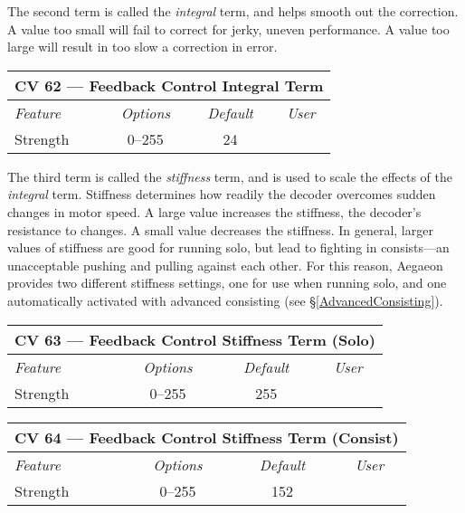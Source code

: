 \documentclass[12pt,letterpaper,draft]{memoir} %
\begin{document}
The second term is called the \textit{integral} term, and helps smooth out the correction. A value too small will fail to correct for jerky, uneven performance. A value too large will result in too slow a correction in error.

\label{CV62}
\begin{center}
\begin{tabular}{|l|c|c|c|}
\hline
\multicolumn{4}{|c|}{\textbf{CV 62 --- Feedback Control Integral Term}} \\ \hline \hline
\textit{Feature} & \textit{Options} & \textit{Default} & \textit{User} \\ \hline
Strength & 0--255 & 24 &\\ \hline
\end{tabular}
\end{center}

\label{MotorControlInConsist}The third term is called the \textit{stiffness} term, and is used to scale the effects of the \textit{integral} term. Stiffness determines how readily the decoder overcomes sudden changes in motor speed. A large value increases the stiffness, the decoder's resistance to changes. A small value decreases the stiffness. In general, larger values of stiffness are good for running solo, but lead to fighting in consists---an unacceptable pushing and pulling against each other. For this reason, Aegaeon provides two different stiffness settings, one for use when running solo, and one automatically activated with advanced consisting (see \S\ref{AdvancedConsisting}).

\label{CV63}
\begin{center}
\begin{tabular}{|l|c|c|c|}
\hline
\multicolumn{4}{|c|}{\textbf{CV 63 --- Feedback Control Stiffness Term (Solo)}} \\ \hline \hline
\textit{Feature} & \textit{Options} & \textit{Default} & \textit{User} \\ \hline
Strength & 0--255 & 255 &\\ \hline
\end{tabular}
\end{center}

\label{CV64}
\begin{center}
\begin{tabular}{|l|c|c|c|}
\hline
\multicolumn{4}{|c|}{\textbf{CV 64 --- Feedback Control Stiffness Term (Consist)}} \\ \hline \hline
\textit{Feature} & \textit{Options} & \textit{Default} & \textit{User} \\ \hline
Strength & 0--255 & 152 &\\ \hline
\end{tabular}
\end{center}
\end{document}
